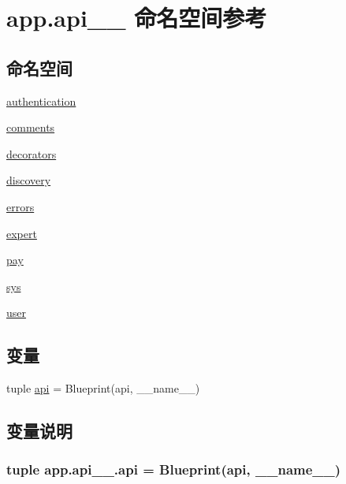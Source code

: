 \hypertarget{namespaceapp_1_1api__1__0}{}\section{app.\+api\+\_\+\_ 命名空间参考}
\label{namespaceapp_1_1api__1__0}
\subsection*{命名空间}
\begin{DoxyCompactItemize}
\item 
 \hyperlink{namespaceapp_1_1api__1__0_1_1authentication}{authentication}
\item 
 \hyperlink{namespaceapp_1_1api__1__0_1_1comments}{comments}
\item 
 \hyperlink{namespaceapp_1_1api__1__0_1_1decorators}{decorators}
\item 
 \hyperlink{namespaceapp_1_1api__1__0_1_1discovery}{discovery}
\item 
 \hyperlink{namespaceapp_1_1api__1__0_1_1errors}{errors}
\item 
 \hyperlink{namespaceapp_1_1api__1__0_1_1expert}{expert}
\item 
 \hyperlink{namespaceapp_1_1api__1__0_1_1pay}{pay}
\item 
 \hyperlink{namespaceapp_1_1api__1__0_1_1sys}{sys}
\item 
 \hyperlink{namespaceapp_1_1api__1__0_1_1user}{user}
\end{DoxyCompactItemize}
\subsection*{变量}
\begin{DoxyCompactItemize}
\item 
tuple \hyperlink{namespaceapp_1_1api__1__0_ad13519ba480d3b685ad1c4a243777d8b}{api} = Blueprint(\textquotesingle{}api\textquotesingle{}, \+\_\+\+\_\+name\+\_\+\+\_\+)
\end{DoxyCompactItemize}


\subsection{变量说明}
\hypertarget{namespaceapp_1_1api__1__0_ad13519ba480d3b685ad1c4a243777d8b}{}
\subsubsection[{api}]{\setlength{\rightskip}{0pt plus 5cm}tuple app.\+api\+\_\+\_.\+api = Blueprint(\textquotesingle{}api\textquotesingle{}, \+\_\+\+\_\+name\+\_\+\+\_\+)}\label{namespaceapp_1_1api__1__0_ad13519ba480d3b685ad1c4a243777d8b}
